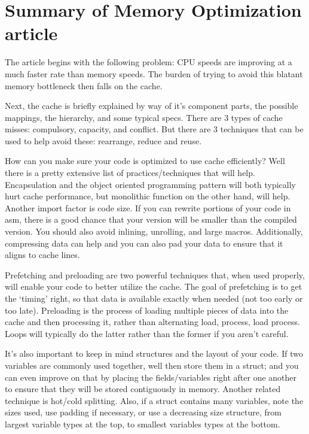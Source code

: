 \documentclass[letterpaper,12pt,titlepage]{article}
\begin{document}
\section*{Summary of Memory Optimization article}

The article begins with the following problem: CPU speeds are improving at a much faster rate than memory speeds. The burden of trying to avoid this blatant memory bottleneck then falls on the cache.

Next, the cache is briefly explained by way of it's component parts, the possible mappings, the hierarchy, and some typical specs. There are 3 types of cache misses: compulsory, capacity, and conflict. But there are 3 techniques that can be used to help avoid these: rearrange, reduce and reuse.

How can you make sure your code is optimized to use cache efficiently? Well there is a pretty extensive list of practices/techniques that will help. Encapsulation and the object oriented programming pattern will both typically hurt cache performance, but monolithic function on the other hand, will help. Another import factor is code size. If you can rewrite portions of your code in asm, there is a good chance that your version will be smaller than the compiled version. You should also avoid inlining, unrolling, and large macros. Additionally, compressing data can help and you can also pad your data to ensure that it aligns to cache lines.

Prefetching and preloading are two powerful techniques that, when used properly, will enable your code to better utilize the cache. The goal of prefetching is to get the `timing' right, so that data is available exactly when needed (not too early or too late). Preloading is the process of loading multiple pieces of data into the cache and then processing it, rather than alternating load, process, load process. Loops will typically do the latter rather than the former if you aren't careful.

It's also important to keep in mind structures and the layout of your code. If two variables are commonly used together, well then store them in a struct; and you can even improve on that by placing the fields/variables right after one another to ensure that they will be stored contiguously in memory. Another related technique is hot/cold splitting. Also, if a struct contains many variables, note the sizes used, use padding if necessary, or use a decreasing size structure, from largest variable types at the top, to smallest variables types at the bottom.
\end{document}
